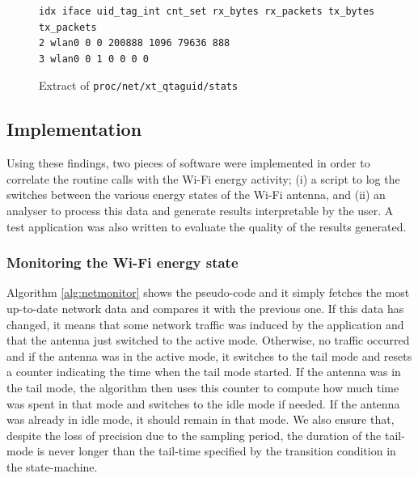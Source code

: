 
\begin{figure}
\begin{lstlisting}
idx iface uid_tag_int cnt_set rx_bytes rx_packets tx_bytes tx_packets
2 wlan0 0 0 200888 1096 79636 888
3 wlan0 0 1 0 0 0 0
\end{lstlisting}
\caption{Extract of \texttt{proc/net/xt\_qtaguid/stats}}
\label{fig:hw:xtstats}
\vspace {-0.32in}
\end{figure}

\subsection{Implementation}

Using these findings, two pieces of software were implemented in order 
to correlate the routine calls with the Wi-Fi energy activity; (i) a 
\python{} script to log the switches between the various energy states 
of the Wi-Fi antenna, and (ii) an analyser to process this data and 
generate results interpretable by the user. A test application was also 
written to evaluate the quality of the results generated.

\subsubsection{Monitoring the Wi-Fi energy state}

Algorithm \ref{alg:netmonitor} shows the pseudo-code and it simply 
fetches the most up-to-date network data and compares it with the 
previous one. If this data has changed, it means that some network 
traffic was induced by the application and that the antenna just 
switched to the active mode. Otherwise, no traffic occurred and if the 
antenna was in the active mode, it switches to the tail mode and resets 
a counter indicating the time when the tail mode started. If the antenna 
was in the tail mode, the algorithm then uses this counter to compute 
how much time was spent in that mode and switches to the idle mode if 
needed. If the antenna was already in idle mode, it should remain in 
that mode. We also ensure that, despite the loss of precision due to the 
sampling period, the duration of the tail-mode is never longer than the 
tail-time specified by the transition condition in the state-machine.

